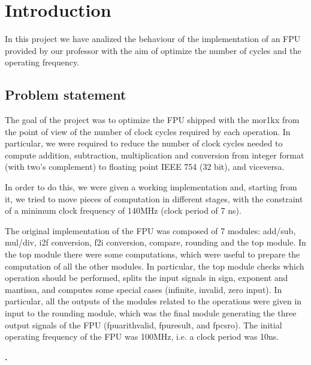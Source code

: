 \section{Introduction}
In this project we have analized the behaviour of the implementation of an FPU \cite{mor1kxcode} provided by our professor with the aim of optimize the number of cycles and the operating frequency.


\subsection{Problem statement}
The goal of the project was to optimize the FPU shipped with the mor1kx from the point of view of the number of clock cycles required by each operation. In particular, we were required to reduce the number of clock cycles needed to compute addition, subtraction, multiplication and conversion from integer format (with two's complement) to floating point IEEE 754 (32 bit), and viceversa.

In order to do this, we were given a working implementation and, starting from it, we tried to move pieces of computation in different stages, with the constraint of a minimum clock frequency of 140MHz (clock period of 7 ns).

The original implementation of the FPU was composed of 7 modules: add/sub, mul/div, i2f conversion, f2i conversion, compare, rounding and the top module. In the top module there were some computations, which were useful to prepare the computation of all the other modules. In particular, the top module checks which operation should be performed, splits the input signals in sign, exponent and mantissa, and computes some special cases (infinite, invalid, zero input).
In particular, all the outputs of the modules related to the operations were given in input to the rounding module, which was the final module generating the three output signals of the FPU (fpu\textunderscore arith\textunderscore valid, fpu\textunderscore result, and fpcsr\textunderscore o). The initial operating frequency of the FPU was 100MHz, i.e. a clock period was 10ns.

\textbf{.}


